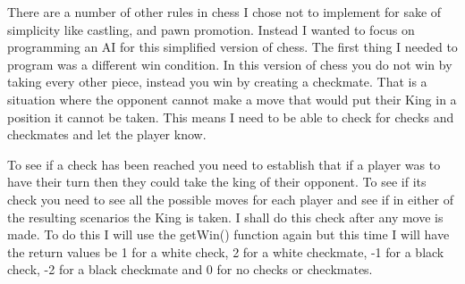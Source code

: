 \documentclass[a4paper]{article}
\begin{document}
There are a number of other rules in chess I chose not to implement for sake of simplicity like castling, and pawn promotion. Instead I wanted to focus on programming an AI for this simplified version of chess. The first thing I needed to program was a different win condition. In this version of chess you do not win by taking every other piece, instead you win by creating a checkmate. That is a situation where the opponent cannot make a move that would put their King in a position it cannot be taken. This means I need to be able to check for checks  and checkmates and let the player know.

To see if a check has been reached you need to establish that if a player was to have their turn then they could take the king of their opponent. To see if its check you need to see all the possible moves for each player and see if in either of the resulting scenarios the King is taken. I shall do this check after any move is made. To do this I will use the getWin() function again but this time I will have the return values be 1 for a white check, 2 for a white checkmate, -1 for a black check, -2 for a black checkmate and 0 for no checks or checkmates.
\end{document}
